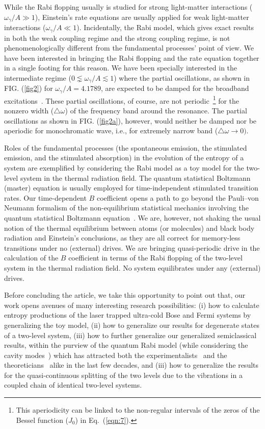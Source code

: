 \documentclass[aps,pra,twocolumn,showpacs,preprintnumbers,amsmath,amssymb,footinbib]{revtex4}
\begin{document}
While the Rabi flopping usually is studied for strong light-matter interactions ($\omega_\gamma/A\gg1$), Einstein's rate equations are usually applied for weak light-matter interactions ($\omega_\gamma/A\ll1$). Incidentally, the Rabi model, which gives exact results in both the weak coupling regime and the strong coupling regime, is not phenomenologically different from the fundamental processes' point of view. We have been interested in bringing the Rabi flopping and the rate equation together in a single footing for this reason. We have been specially interested in the intermediate regime ($0\lnsim\omega_\gamma/A\lesssim1$) where the partial oscillations, as shown in FIG. (\ref{fig2}) for $\omega_\gamma/A=4.1789$, are expected to be damped for the broadband excitations~\cite{Cohen-Tannudji2}. These partial oscillations, of course, are not periodic~\footnote{This aperiodicity can be linked to the non-regular intervals of the zeros of the Bessel function ($J_0$) in Eq.~(\ref{eqn:7}).} for the nonzero width ($\triangle\omega$) of the frequency band around the resonance. The partial oscillations as shown in FIG. (\ref{fig2a}), however, would neither be damped nor be aperiodic for monochromatic wave, i.e., for extremely narrow band ($\triangle\omega\rightarrow0)$.

Roles of the fundamental processes (the spontaneous emission, the stimulated emission, and the stimulated absorption) in the evolution of the entropy of a system are exemplified by considering the Rabi model as a toy model for the two-level system in the thermal radiation field. The quantum statistical Boltzmann (master) equation is usually employed for time-independent stimulated transition rates. Our time-dependent $B$ coefficient opens a path to go beyond the Pauli--von Neumann formalism of the non-equilibrium statistical mechanics involving the quantum statistical Boltzmann equation~\cite{Pauli,Neumann}. We are, however, not shaking the usual notion of the thermal equilibrium between atoms (or molecules) and black body radiation and Einstein's conclusions, as they are all correct for memory-less transitions under no (external) drives. We are bringing quasi-periodic drive in the calculation of the $B$ coefficient in terms of the Rabi flopping of the two-level system in the thermal radiation field. No system equilibrates under any (external) drives.   

Before concluding the article, we take this opportunity to point out that, our work opens avenues of many interesting research possibilities: (i) how to calculate entropy productions of the laser trapped ultra-cold Bose and Fermi systems by generalizing the toy model, (ii) how to generalize our results for degenerate states of a two-level system, (iii) how to further generalize our generalized semiclassical results, within the purview of the quantum Rabi model (while considering the cavity modes~\cite{Jaynes,Wilczewski}) which has attracted both the experimentalists~\cite{Meekhof,Brune,Haroche} and the theoreticians~\cite{Agarwal,Wilczewski,Xie,Vandaele} alike in the last few decades, and (iii) how to generalize the results for the quasi-continuous splitting of the two levels due to the vibrations in a coupled chain of identical two-level systems.   
\end{document}

